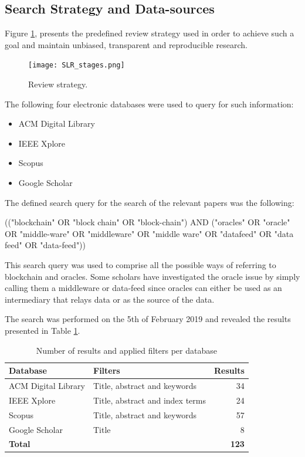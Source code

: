 \subsection{Search Strategy and Data-sources}
Figure \ref{fig:/figures/SLR_stages}, presents the predefined review strategy used in order to achieve such a goal and maintain unbiased, transparent and reproducible research.

\begin{figure}[t]
  \begin{center}
    \leavevmode
    \texttt{[image: SLR\_stages.png]}
    \caption{Review strategy.}
    \label{fig:/figures/SLR_stages}
  \end{center}
\end{figure}

The following four electronic databases were used to query for such information:

\begin{itemize}
  \item ACM Digital Library
  \item IEEE Xplore
  \item Scopus
  \item Google Scholar
\end{itemize}


The defined search query for the search of the relevant papers was the following:

(("blockchain" OR "block chain" OR "block-chain")
AND
("oracles" OR "oracle" OR "middle-ware" OR "middleware" OR "middle ware" OR "datafeed" OR "data feed" OR "data-feed"))

This search query was used to comprise all the possible ways of referring to blockchain and oracles. Some scholars have investigated the oracle issue by simply calling them a middleware or data-feed since oracles can either be used as an intermediary that relays data or as the source of the data.

The search was performed on the 5th of February 2019 and revealed the results presented in Table \ref{search-results-table}.

\begin{table}[H]
  \centering
  \begin{tabular}{llr}
    \hline
    \textbf{Database}   & \textbf{Filters}                & \textbf{Results} \\ \hline
    ACM Digital Library & Title, abstract and keywords    & 34               \\
    IEEE Xplore         & Title, abstract and index terms & 24               \\
    Scopus              & Title, abstract and keywords    & 57               \\
    Google Scholar      & Title                           & 8                \\ \hline
    \textbf{Total}      & \textbf{}                       & \textbf{123}     \\ \hline
  \end{tabular}
  \caption{Number of results and applied filters per database}
  \label{search-results-table}
\end{table}

